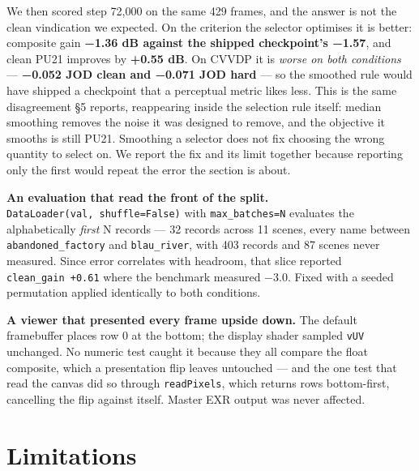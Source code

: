 We then scored step 72,000 on the same 429 frames, and the answer is not the
clean vindication we expected. On the criterion the selector optimises it is
better: composite gain \textbf{−1.36 dB against the shipped checkpoint's −1.57}, and
clean PU21 improves by \textbf{+0.55 dB}. On CVVDP it is \emph{worse on both conditions} ---
\textbf{−0.052 JOD clean and −0.071 JOD hard} --- so the smoothed rule would have
shipped a checkpoint that a perceptual metric likes less. This is the same
disagreement §5 reports, reappearing inside the selection rule itself: median
smoothing removes the noise it was designed to remove, and the objective it
smooths is still PU21. Smoothing a selector does not fix choosing the wrong
quantity to select on. We report the fix and its limit together because
reporting only the first would repeat the error the section is about.

\textbf{An evaluation that read the front of the split.} \texttt{DataLoader(val,\ shuffle=False)} with \texttt{max\_batches=N} evaluates the alphabetically \emph{first} N
records --- 32 records across 11 scenes, every name between \texttt{abandoned\_factory}
and \texttt{blau\_river}, with 403 records and 87 scenes never measured. Since error
correlates with headroom, that slice reported \texttt{clean\_gain\ +0.61} where the
benchmark measured −3.0. Fixed with a seeded permutation applied identically to
both conditions.

\textbf{A viewer that presented every frame upside down.} The default framebuffer
places row 0 at the bottom; the display shader sampled \texttt{vUV} unchanged. No
numeric test caught it because they all compare the float composite, which a
presentation flip leaves untouched --- and the one test that read the canvas did
so through \texttt{readPixels}, which returns rows bottom-first, cancelling the flip
against itself. Master EXR output was never affected.

\hypertarget{limitations}{%
\section{Limitations}\label{limitations}}

